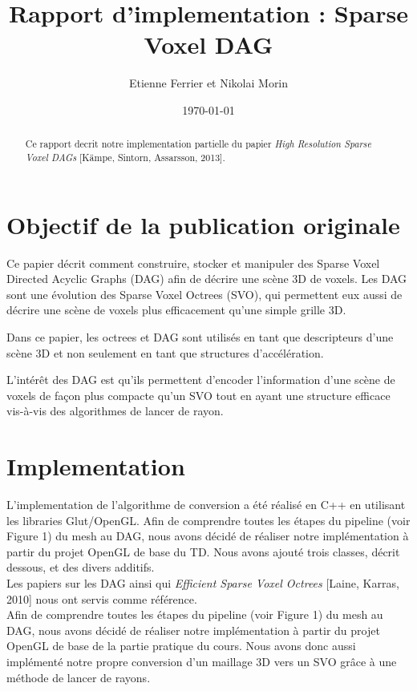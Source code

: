 \documentclass[a4paper]{article}
\title{Rapport d'implementation : Sparse Voxel DAG}
\author{Etienne Ferrier et Nikolai Morin}
\date{\today}
\begin{document}
\maketitle

\begin{abstract}
Ce rapport decrit notre implementation partielle du papier \textit{High Resolution Sparse Voxel DAGs} [Kämpe, Sintorn, Assarsson, 2013].
\end{abstract}

\section{Objectif de la publication originale}
Ce papier décrit comment construire, stocker et manipuler des Sparse Voxel Directed Acyclic Graphs (DAG) afin de décrire une scène 3D de voxels. Les DAG sont une évolution des Sparse Voxel Octrees (SVO), qui permettent eux aussi de décrire une scène de voxels plus efficacement qu’une simple grille 3D.

Dans ce papier, les octrees et DAG sont utilisés en tant que descripteurs d’une scène 3D et non seulement en tant que structures d’accélération.

L’intérêt des DAG est qu’ils permettent d’encoder l’information d'une scène de voxels de façon plus compacte qu’un SVO tout en ayant une structure efficace vis-à-vis des algorithmes de lancer de rayon.


\section{Implementation}
L'implementation de l'algorithme de conversion a été réalisé en C++ en utilisant les libraries Glut/OpenGL. Afin de comprendre toutes les étapes du pipeline (voir Figure 1) du mesh au DAG, nous avons décidé de réaliser notre implémentation à partir du projet OpenGL de base du TD. Nous avons ajouté trois classes, décrit dessous, et des divers additifs. \\

Les papiers sur les DAG ainsi qui \textit{Efficient Sparse Voxel Octrees} [Laine, Karras, 2010] nous ont servis comme référence. \\ 

Afin de comprendre toutes les étapes du pipeline (voir Figure 1) du mesh au DAG, nous avons décidé de réaliser notre implémentation à partir du projet OpenGL de base de la partie pratique du cours. Nous avons donc aussi implémenté notre propre conversion d’un maillage 3D vers un SVO grâce à une méthode de lancer de rayons.
\end{document}
